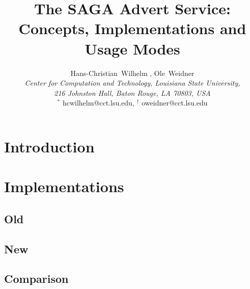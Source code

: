 \documentclass[a4paper,10pt,twocolumn]{article}
\begin{document}
\thispagestyle{plain}
\title{The SAGA Advert Service: Concepts, Implementations and Usage Modes}
\author{Hans-Christian~Wilhelm \footnotemark, Ole~Weidner\footnotemark \\ {\em \small{Center for Computation and Technology, Louisiana State University,}} \\ {\em {\small 216 Johnston Hall, Baton Rouge, LA 70803, USA}}
\\ {\footnotesize $^*$ hcwilhelm@cct.lsu.edu, $^\dag$ oweidner@cct.lsu.edu}}

\date{}

\maketitle


\begin{abstract}

\end{abstract}

\section{Introduction} 

\section{Implementations} 

\subsection{Old}

\subsection{New}

\subsection{Comparison}

\thispagestyle{plain}
\end{document}
